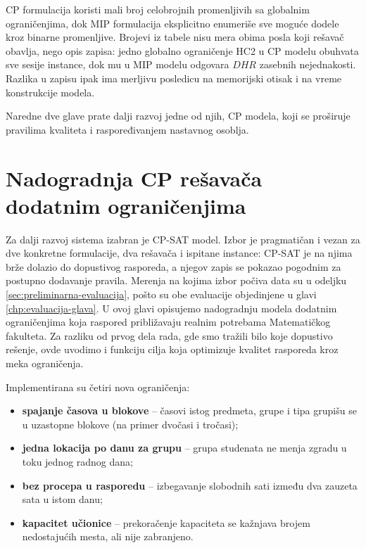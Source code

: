 \documentclass[12pt,oneside]{memoir}
\begin{document}
CP formulacija koristi mali broj celobrojnih promenljivih sa globalnim
ograničenjima, dok MIP formulacija eksplicitno enumeriše sve moguće
dodele kroz binarne promenljive. Brojevi iz tabele nisu mera obima
posla koji rešavač obavlja, nego opis zapisa: jedno globalno
ograničenje HC2 u CP modelu obuhvata sve sesije instance, dok mu u MIP
modelu odgovara $DHR$ zasebnih nejednakosti. Razlika u zapisu ipak ima
merljivu posledicu na memorijski otisak i na vreme konstrukcije
modela.

Naredne dve glave prate dalji razvoj
jedne od njih, CP modela, koji se proširuje pravilima kvaliteta i
raspoređivanjem nastavnog osoblja.


\chapter{Nadogradnja CP rešavača dodatnim ograničenjima}
\label{chp:nadogradnja}

Za dalji razvoj sistema izabran je CP-SAT model. Izbor je pragmatičan i
vezan za dve konkretne formulacije, dva rešavača i ispitane instance:
CP-SAT je na njima brže dolazio do dopustivog rasporeda, a njegov zapis
se pokazao pogodnim za postupno dodavanje pravila. Merenja na kojima
izbor počiva data su u odeljku \ref{sec:preliminarna-evaluacija}, pošto
su obe evaluacije objedinjene u glavi \ref{chp:evaluacija-glava}. U
ovoj glavi opisujemo nadogradnju modela dodatnim ograničenjima koja
raspored približavaju realnim potrebama Matematičkog fakulteta. Za razliku od prvog dela rada,
gde smo tražili bilo koje dopustivo rešenje, ovde uvodimo i funkciju
cilja koja optimizuje kvalitet rasporeda kroz meka ograničenja.

Implementirana su četiri nova ograničenja:
\begin{itemize}
\item \textbf{spajanje časova u blokove} -- časovi istog predmeta, grupe
  i tipa grupišu se u uzastopne blokove (na primer dvočasi i tročasi);
\item \textbf{jedna lokacija po danu za grupu} -- grupa studenata ne menja
  zgradu u toku jednog radnog dana;
\item \textbf{bez procepa u rasporedu} -- izbegavanje slobodnih sati
  između dva zauzeta sata u istom danu;
\item \textbf{kapacitet učionice} -- prekoračenje kapaciteta se kažnjava
  brojem nedostajućih mesta, ali nije zabranjeno.
\end{itemize}
\end{document}
